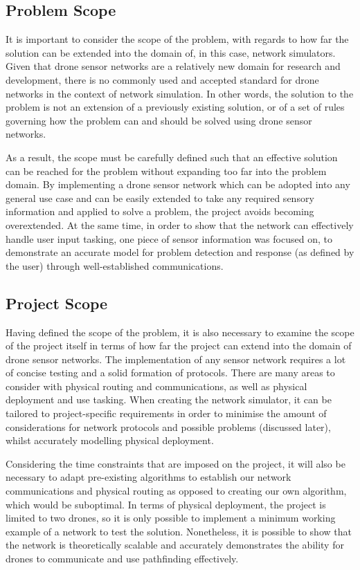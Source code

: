 \subsection{Problem Scope}
It is important to consider the scope of the problem, with regards to how far the solution can be extended into the domain of, in this case, network simulators. Given that drone sensor networks are a relatively new domain for research and development, there is no commonly used and accepted standard for drone networks in the context of network simulation. In other words, the solution to the problem is not an extension of a previously existing solution, or of a set of rules governing how the problem can and should be solved using drone sensor networks.

As a result, the scope must be carefully defined such that an effective solution can be reached for the problem without expanding too far into the problem domain. By implementing a drone sensor network which can be adopted into any general use case and can be easily extended to take any required sensory information and applied to solve a problem, the project avoids becoming overextended. At the same time, in order to show that the network can effectively handle user input tasking, one piece of sensor information was focused on, to demonstrate an accurate model for problem detection and response (as defined by the user) through well-established communications. 

\subsection{Project Scope}
Having defined the scope of the problem, it is also necessary to examine the scope of the project itself in terms of how far the project can extend into the domain of drone sensor networks. The implementation of any sensor network requires a lot of concise testing and a solid formation of protocols. There are many areas to consider with physical routing and communications, as well as physical deployment and use tasking. When creating the network simulator, it can be tailored to project-specific requirements in order to minimise the amount of considerations for network protocols and possible problems (discussed later), whilst accurately modelling physical deployment. 

Considering the time constraints that are imposed on the project, it will also be necessary to adapt pre-existing algorithms to establish our network communications and physical routing as opposed to creating our own algorithm, which would be suboptimal. In terms of physical deployment, the project is limited to two drones, so it is only possible to implement a minimum working example of a network to test the solution. Nonetheless, it is possible to show that the network is theoretically scalable and accurately demonstrates the ability for drones to communicate and use pathfinding effectively.

